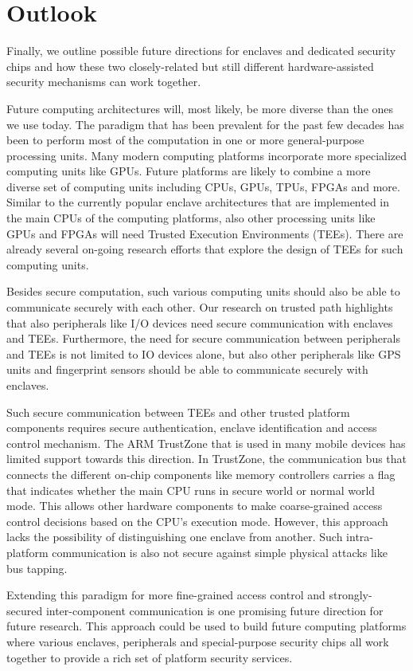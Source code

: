 
\section*{Outlook}

Finally, we outline possible future directions for enclaves and dedicated security chips and how these two closely-related but still different hardware-assisted security mechanisms can work together.

Future computing architectures will, most likely, be more diverse than the ones we use today. The paradigm that has been prevalent for the past few decades has been to perform most of the computation in one or more general-purpose processing units. Many modern computing platforms incorporate more specialized computing units like GPUs. Future platforms are likely to combine a more diverse set of computing units including CPUs, GPUs, TPUs, FPGAs and more.%
Similar to the currently popular enclave architectures that are implemented in the main CPUs of the computing platforms, also other processing units like GPUs and FPGAs will need Trusted Execution Environments (TEEs). There are already several on-going research efforts that explore the design of TEEs for such computing units.

Besides secure computation, such various computing units should also be able to communicate securely with each other. Our research on trusted path highlights that also peripherals like I/O devices need secure communication with enclaves and TEEs. Furthermore, the need for secure communication between peripherals and TEEs is not limited to IO devices alone, but also other peripherals like GPS units and fingerprint sensors should be able to communicate securely with enclaves. 

Such secure communication between TEEs and other trusted platform components requires secure authentication, enclave identification and access control mechanism. The ARM TrustZone that is used in many mobile devices has limited support towards this direction. In TrustZone, the communication bus that connects the different on-chip components like memory controllers carries a flag that indicates whether the main CPU runs in secure world or normal world mode. This allows other hardware components to make coarse-grained access control decisions based on the CPU’s execution mode. However, this approach lacks the possibility of distinguishing one enclave from another. Such intra-platform communication is also not secure against simple physical attacks like bus tapping. 

Extending this paradigm for more fine-grained access control and strongly-secured inter-component communication is one promising future direction for future research. This approach could be used to build future computing platforms where various enclaves, peripherals and special-purpose security chips all work together to provide a rich set of platform security services.
